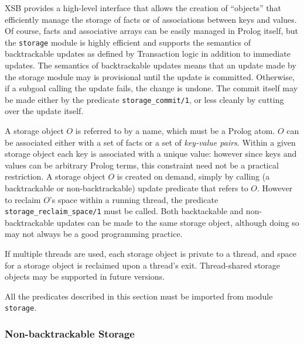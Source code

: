 XSB provides a high-level interface that allows the creation of
``objects'' that efficiently manage the storage of facts or of
associations between keys and values.  Of course, facts and
associative arrays can be easily managed in Prolog itself, but the
{\tt storage} module is highly efficient and supports the semantics of
backtrackable updates as defined by Transaction logic \cite{BoKi94} in
addition to immediate updates.  The semantics of backtrackable updates
means that an update made by the storage module may is provisional
until the update is committed.  Otherwise, if a subgoal calling the
update fails, the change is undone. The commit itself may be made
either by the predicate {\tt storage\_commit/1}, or less cleanly by
cutting over the update itself.

A storage object $O$ is referred to by a name, which must be a Prolog
atom.  $O$ can be associated either with a set of facts or a set of
\emph{key-value pairs}.  Within a given storage object each key is
associated with a unique value: however since keys and values can be
arbitrary Prolog terms, this constraint need not be a practical
restriction.  A storage object $O$ is created on demand, simply by
calling (a backtrackable or non-backtrackable) update predicate that
refers to $O$.  However to reclaim $O$'s space within a running
thread, the predicate {\tt storage\_reclaim\_space/1} must be called.
Both backtackable and non-backtrackable updates can be made to the
same storage object, although doing so may not always be a good
programming practice.

If multiple threads are used, each storage object is private to a
thread, and space for a storage object is reclaimed upon a thread's
exit.  Thread-shared storage objects may be supported in future
versions.

All the predicates described in this section must be imported from
module {\tt storage}.

\subsubsection{Non-backtrackable Storage}

